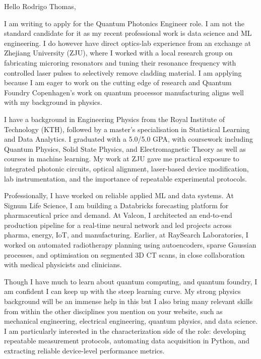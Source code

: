 \documentclass[11pt,a4paper]{moderncv}
\begin{document}
\makecvtitle
Hello Rodrigo Thomas,

\vspace*{2em}
I am writing to apply for the Quantum Photonics Engineer role. I am not the standard candidate for it as my recent professional work is data science and ML engineering. I do however have direct optics-lab experience from an exchange at Zhejiang University (ZJU), where I worked with a local research group on fabricating microring resonators and tuning their resonance frequency with controlled laser pulses to selectively remove cladding material. I am applying because I am eager to work on the cutting edge of research and Quantum Foundry Copenhagen's work on quantum processor manufacturing aligns well with my background in physics.

\hspace*{2em}
I have a background in Engineering Physics from the Royal Institute of Technology (KTH), followed by a master's specialisation in Statistical Learning and Data Analytics. I graduated with a 5.0/5.0 GPA, with coursework including Quantum Physics, Solid State Physics, and Electromagnetic Theory as well as courses in machine learning. My work at ZJU gave me practical exposure to integrated photonic circuits, optical alignment, laser-based device modification, lab instrumentation, and the importance of repeatable experimental protocols.

\hspace*{2em}
Professionally, I have worked on reliable applied ML and data systems. At Signum Life Science, I am building a Databricks forecasting platform for pharmaceutical price and demand. At Valcon, I architected an end-to-end production pipeline for a real-time neural network and led projects across pharma, energy, IoT, and manufacturing. Earlier, at RaySearch Laboratories, I worked on automated radiotherapy planning using autoencoders, sparse Gaussian processes, and optimisation on segmented 3D CT scans, in close collaboration with medical physicists and clinicians.

\hspace*{2em}
Though I have much to learn about quantum computing, and quantum foundry, I am confident I can keep up with the steep learning curve. My strong physics background will be an immense help in this but I also bring many relevant skills from within the other disciplines you mention on your website, such as mechanical engineering, electrical engineering, quantum physics, and data science. I am particularly interested in the characterization side of the role: developing repeatable measurement protocols, automating data acquisition in Python, and extracting reliable device-level performance metrics.
\end{document}
